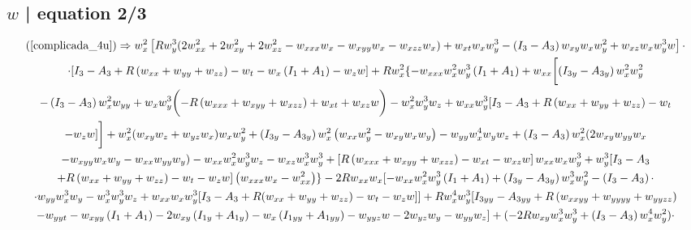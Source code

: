 \documentclass[12pt,a4paper]{article}
\begin{document}
\subsection{$w$ | equation 2/3}

    \footnotesize %
	\begin{multline}
	  (\ref{complicada_4u}) \Rightarrow
    w_x^2 \left[ R w_y^3 ( 2 w_{xx}^2
	+ 2 w_{xy}^2
	+ 2 w_{xz}^2
	- w_{xxx}w_x
	- w_{xyy} w_x
	- w_{xzz} w_x )
	+ w_{xt} w_x w_y^3
	- \left( I_3 - A_3 \right) w_{xy} w_x w_y^2
	+ w_{xz} w_x w_y^3 w \right] \cdot \\
	\cdot [ I_3 - A_3
	+ R \left(w_{xx}
	+ w_{yy}
	+ w_{zz} \right)
	- w_t
	- w_x \left( I_1 + A_1 \right)
	- w_z w ]
    + R w_x^2 \{ - w_{xxx} w_x^2 w_y^3 \left( I_1 + A_1 \right)
	  + w_{xx} \biggl[ \left( I_{3y} - A_{3y} \right) w_x^2 w_y^2 \\
	  - \left( I_3 - A_3 \right) w_x^2 w_{yy}
	  + w_x w_y^3 \biggl( -R \left(w_{xxx} + w_{xyy} + w_{xzz} \right)
	  + w_{xt}
	  + w_{xz} w \biggr)
	  - w_x^2 w_y^3 w_z
	  + w_{xx} w_y^3 [ I_3 - A_3
	  + R \left(w_{xx} + w_{yy} + w_{zz} \right)
	  - w_t \\
	  - w_z w ] \biggr]
	  + w_x^2 ( w_{xy} w_z
	  + w_{yz} w_x ) w_x w_y^2
	  + \left( I_{3y} - A_{3y} \right) w_x^2 \left( w_{xx} w_y^2
	  - w_{xy} w_x w_y \right)
	  - w_{yy} w_x^4 w_y w_z
	  + \left( I_3 - A_3 \right) w_x^2 ( 2 w_{xy} w_{yy} w_x \\
	  - w_{xyy} w_x w_y
	  - w_{xx} w_{yy} w_y )
	- w_{xx} w_x^2 w_y^3 w_z
	  - w_{xz} w_x^3 w_y^3
	  + \left[ R \left(w_{xxx} + w_{xyy} + w_{xzz} \right)
	  - w_{xt}
	  - w_{xz} w \right] w_{xx} w_x w_y^3
	  + w_y^3 [ I_3 - A_3 \\
	  + R \left(w_{xx} + w_{yy} + w_{zz} \right)
	  - w_t
	  - w_z w ] \left( w_{xxx} w_x
		- w_{xx}^2 \right) \}
		- 2R w_{xx} w_x [ - w_{xx} w_x^2 w_y^3 \left( I_1 + A_1 \right)
		+ \left( I_{3y} - A_{3y} \right) w_x^3 w_y^2
		- \left( I_3 - A_3 \right) \cdot \\
		\cdot w_{yy} w_x^3 w_y
		- w_x^3 w_y^3 w_z
	  + w_{xx} w_x w_y^3 [ I_3 - A_3
	  + R ( w_{xx} + w_{yy}
	  + w_{zz} )
	  - w_t
	  - w_z w ] ]
	  + R w_x^4 w_y^3 [ I_{3yy} - A_{3yy}
	  + R \left(w_{xxyy} + w_{yyyy} + w_{yyzz} \right) \\
	  - w_{yyt}
	  - w_{xyy} \left( I_1 + A_1 \right)
	  - 2 w_{xy} \left( I_{1y} + A_{1y} \right)
	   - w_x \left( I_{1yy} + A_{1yy} \right)
	   - w_{yyz} w
	   - 2 w_{yz} w_y
	   - w_{yy} w_z ]
	   + (- 2R w_{xy} w_x^3 w_y^3
	   + \left( I_3 - A_3 \right) w_x^4 w_y^2 ) \cdot \\

\end{multline}
\end{document}
